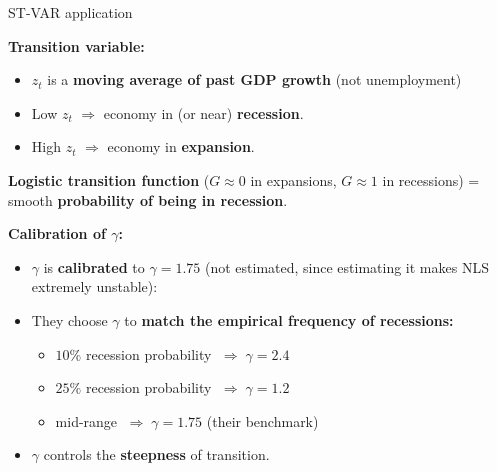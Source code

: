 \documentclass{beamer}
\begin{document}
\begin{frame}{ST-VAR application}
\small

\textbf{Transition variable:}
\begin{itemize}
  \item $z_t$ is a \textbf{moving average of past GDP growth} (not unemployment)
  \item Low $z_t$ $\Rightarrow$ economy in (or near) \textbf{recession}.
  \item High $z_t$ $\Rightarrow$ economy in \textbf{expansion}.
\end{itemize}

\textbf{Logistic transition function} ($G \approx 0$ in expansions, $G \approx 1$ in recessions) = smooth \textbf{probability of being in recession}.

\medskip

\textbf{Calibration of $\gamma$:}
\begin{itemize}
  \item $\gamma$ is \textbf{calibrated} to $\gamma = 1.75$ (not estimated, since estimating it makes NLS extremely unstable):
  \item They choose $\gamma$ to \textbf{match the empirical frequency of recessions:}
\begin{itemize}
  \item $10\%$ recession probability $\;\Rightarrow\; \gamma = 2.4$
  \item $25\%$ recession probability $\;\Rightarrow\; \gamma = 1.2$
  \item mid-range $\;\Rightarrow\; \gamma = 1.75$ (their benchmark)
\end{itemize}
          \item $\gamma$ controls the \textbf{steepness} of transition.

\end{itemize}


\end{frame}
\end{document}
